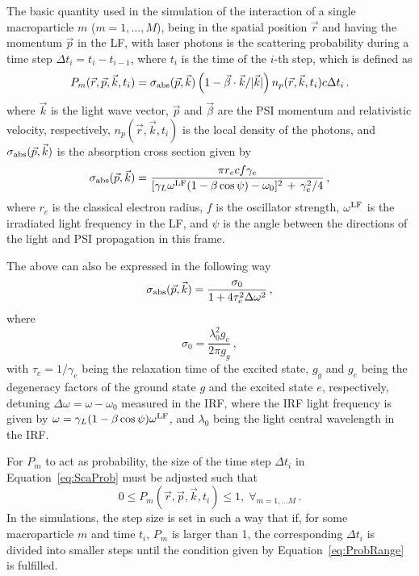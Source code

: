 The basic quantity used in the simulation of the interaction of a single macroparticle $m$ ($m=1,\ldots, M$), being in the spatial position $\vec{r}$ and having the momentum $\vec{p}$ in the LF, with laser photons is the scattering probability during a time step $\Delta t_i = t_i - t_{i-1}$, where $t_i$ is the time of the $i$-th step, which is defined as 
\begin{equation}
    P_m(\vec{r},\vec{p},\vec{k},t_i) = \sigma_{\rm abs}(\vec{p},\vec{k})\left(1-\vec{\beta}\cdot\vec{k}/|\vec{k}|\right) n_p(\vec{r},\vec{k},t_i) c\Delta t_i\,.
    \label{eq:ScaProb}
\end{equation}
where $\vec{k}$ is the light wave vector, $\vec{p}$ and $\vec{\beta}$ are the PSI momentum and relativistic velocity, respectively, $n_p(\vec{r},\vec{k},t_i)$ is the local density of the photons, and $\sigma_{\rm abs}(\vec{p},\vec{k})$ is the absorption cross section given by \cite{Bessonov:1995eq}
\begin{equation}
    \sigma_{\rm abs}(\vec{p},\vec{k}) = \frac{\pi r_e c f\gamma_e}{[\gamma_L\omega^{\rm LF}(1-\beta\cos\psi) - \omega_0]^2 \,+ \,\gamma_e^2/4}\,,
    \label{eq:sigabs1}
\end{equation}
where $r_e$ is the classical electron radius, $f$ is the oscillator strength, $\omega^{\rm LF}$ is the irradiated light frequency in the LF, and $\psi$ is the angle between the directions of the light and PSI propagation in this frame.

The above can also be expressed in the following way
\begin{equation}
    \sigma_{\rm abs}(\vec{p},\vec{k}) = \frac{\sigma_0}{1 + 4\tau_e^2 \Delta\omega^2}\,,
    \label{eq:sigabs2}
\end{equation}
where 
\begin{equation}
    \sigma_0 = \frac{\lambda_0^2g_e}{2\pi g_g}\,,
\label{eq:sigma0}
\end{equation}
with $\tau_e=1/\gamma_e$ being the relaxation time of the excited state,  $g_g$ and $g_e$ being the degeneracy factors of the ground state $g$ and the excited state $e$, respectively, detuning $\Delta\omega = \omega - \omega_0$ measured in the IRF, where the IRF light frequency is given by $\omega=\gamma_L(1-\beta\cos\psi)\omega^{\rm LF}$, and $\lambda_0$ being the light central wavelength in the IRF.

For $P_m$ to act as probability, the size of the time step $\Delta t_i$ in Equation~\ref{eq:ScaProb} must be adjusted such that 
\begin{equation}
    0 \le P_m(\vec{r},\vec{p},\vec{k},t_i) \le 1, \; \forall_{m=1,\ldots M}\,.
\label{eq:ProbRange}
\end{equation}
In the simulations, the step size is set in such a way that if, for some macroparticle $m$ and time $t_i$, $P_m$ is larger than 1, the corresponding $\Delta t_i$ is divided into smaller steps until the condition given by Equation~\ref{eq:ProbRange} is fulfilled.

